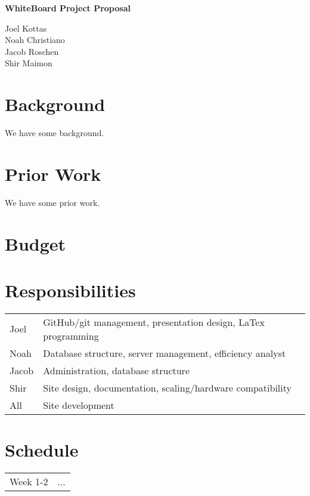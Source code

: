 \documentclass[12pt]{article}
\begin{document}
\huge{\textbf{WhiteBoard Project Proposal}}

\vspace{10 pt}

\large{
    \noindent
    Joel Kottas\\Noah Christiano\\Jacob Roschen\\Shir Maimon
}

\vspace{10 pt}

\section{Background}

We have some background.

\section{Prior Work}

We have some prior work.\cite{Hi}

\section{Budget}

\section{Responsibilities}

\begin{tabular}{ll}
    Joel&GitHub/git management, presentation design, LaTex programming\\
    Noah&Database structure, server management, efficiency analyst\\
    Jacob&Administration, database structure\\
    Shir&Site design, documentation, scaling/hardware compatibility\\
    All&Site development\\
\end{tabular}

\section{Schedule}

\begin{tabular}{ll}
    Week 1-2&...\\
\end{tabular}


{}

\end{document}
